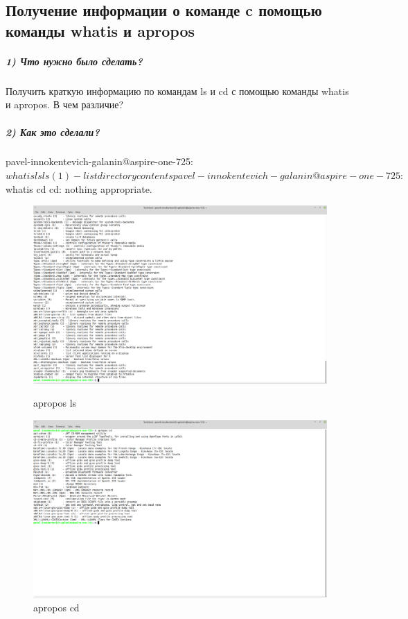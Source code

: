 \subsection{Получение информации о команде c помощью команды whatis и apropos}

\subparagraph{1) Что нужно было сделать?}

Получить краткую информацию по командам ls и cd с помощью команды whatis и apropos. В чем различие?

\subparagraph{2) Как это сделали?}

\begin{MyVerbatimCode}[label=Debian terminal]
pavel-innokentevich-galanin@aspire-one-725:~$ whatis ls
ls (1)               - list directory contents
pavel-innokentevich-galanin@aspire-one-725:~$ whatis cd
cd: nothing appropriate.
\end{MyVerbatimCode}

\begin{figure}[!htp]
    \begin{minipage}{0.49\textwidth}
        \centering
        \includegraphics[width=\linewidth]
            {../input/task-1/6/apropos-ls.png}
        \caption{apropos ls}
        \label{fig:apropos-ls}
    \end{minipage}
    \begin{minipage}{0.49\textwidth}
        \centering
        \includegraphics[width=\linewidth]
            {../input/task-1/6/apropos-cd.png}
        \caption{apropos cd}
        \label{fig:apropos-cd}
    \end{minipage}
\end{figure}

